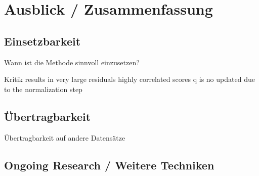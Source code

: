 \chapter{Ausblick / Zusammenfassung}

\label{conclusion}

\section{Einsetzbarkeit}
Wann ist die Methode sinnvoll einzusetzen?

Kritik 
results in very large residuals
highly correlated scores
q is no updated due to the normalization step

\section{Übertragbarkeit}
Übertragbarkeit auf andere Datensätze

\section{Ongoing Research / Weitere Techniken}